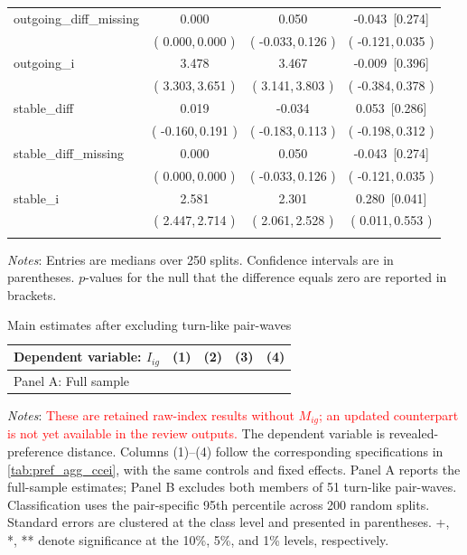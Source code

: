 \documentclass[11 pt]{article}
\begin{document}
\begin{table}[H]
\begin{threeparttable}
\begin{tabular}{lccc}
outgoing\_diff\_missing & 0.000 & 0.050 & -0.043 \,[0.274] \\
& ( 0.000,\,0.000 ) & ( -0.033,\,0.126 ) & ( -0.121,\,0.035 ) \\
\addlinespace
outgoing\_i & 3.478 & 3.467 & -0.009 \,[0.396] \\
& ( 3.303,\,3.651 ) & ( 3.141,\,3.803 ) & ( -0.384,\,0.378 ) \\
\addlinespace
stable\_diff & 0.019 & -0.034 & 0.053 \,[0.286] \\
& ( -0.160,\,0.191 ) & ( -0.183,\,0.113 ) & ( -0.198,\,0.312 ) \\
\addlinespace
stable\_diff\_missing & 0.000 & 0.050 & -0.043 \,[0.274] \\
& ( 0.000,\,0.000 ) & ( -0.033,\,0.126 ) & ( -0.121,\,0.035 ) \\
\addlinespace
stable\_i & 2.581 & 2.301 & 0.280 \,[0.041] \\
& ( 2.447,\,2.714 ) & ( 2.061,\,2.528 ) & ( 0.011,\,0.553 ) \\
\addlinespace
\hline \bottomrule
\end{tabular}
\end{threeparttable}
\begin{minipage}{\textwidth}
{\footnotesize \emph{Notes}: Entries are medians over 250 splits. Confidence intervals are in parentheses. $p$-values for the null that the difference equals zero are reported in brackets.}
\end{minipage}
\end{table}

\begin{table}[H]
\centering
\caption{Main estimates after excluding turn-like pair-waves}
\label{tab:taking_turns_exclusion}
\begin{tabular}{lcccc}
\toprule \hline
Dependent variable: $I_{ig}$ & (1) & (2) & (3) & (4) \\ \midrule
\multicolumn{5}{l}{Panel A: Full sample} \\

\end{tabular}
\begin{minipage}{\textwidth}
{\footnotesize \emph{Notes}: \textcolor{red}{These are retained raw-index results without $M_{ig}$; an updated counterpart is not yet available in the review outputs.}  The dependent variable is revealed-preference distance. Columns (1)--(4) follow the corresponding specifications in \autoref{tab:pref_agg_ccei}, with the same controls and fixed effects. Panel A reports the full-sample estimates; Panel B excludes both members of 51 turn-like pair-waves. Classification uses the pair-specific 95th percentile across 200 random splits. Standard errors are clustered at the class level and presented in parentheses. +, *, ** denote significance at the 10\%, 5\%, and 1\% levels, respectively.}
\end{minipage}
\end{table}
\end{document}

